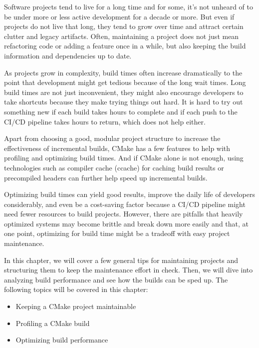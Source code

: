 Software projects tend to live for a long time and for some, it's not unheard of to be under more or less active development for a decade or more. But even if projects do not live that long, they tend to grow over time and attract certain clutter and legacy artifacts. Often, maintaining a project does not just mean refactoring code or adding a feature once in a while, but also keeping the build information and dependencies up to date.

As projects grow in complexity, build times often increase dramatically to the point that development might get tedious because of the long wait times. Long build times are not just inconvenient, they might also encourage developers to take shortcuts because they make trying things out hard. It is hard to try out something new if each build takes hours to complete and if each push to the CI/CD pipeline takes hours to return, which does not help either.

Apart from choosing a good, modular project structure to increase the effectiveness of incremental builds, CMake has a few features to help with profiling and optimizing build times. And if CMake alone is not enough, using technologies such as compiler cache (ccache) for caching build results or precompiled headers can further help speed up incremental builds.

Optimizing build times can yield good results, improve the daily life of developers considerably, and even be a cost-saving factor because a CI/CD pipeline might need fewer resources to build projects. However, there are pitfalls that heavily optimized systems may become brittle and break down more easily and that, at one point, optimizing for build time might be a tradeoff with easy project maintenance.

In this chapter, we will cover a few general tips for maintaining projects and structuring them to keep the maintenance effort in check. Then, we will dive into analyzing build performance and see how the builds can be sped up. The following topics will be covered in this chapter:

\begin{itemize}
\item 
Keeping a CMake project maintainable

\item 
Profiling a CMake build

\item 
Optimizing build performance
\end{itemize}